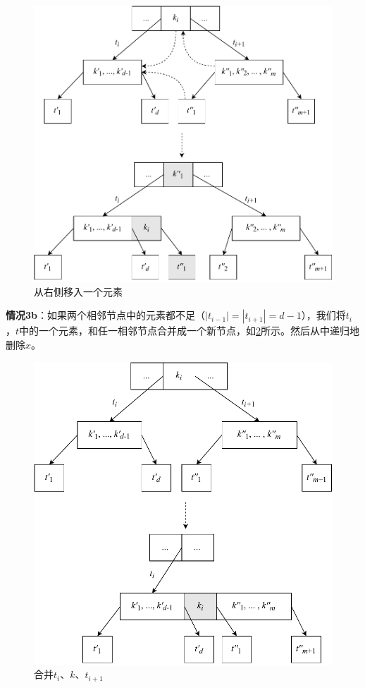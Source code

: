 \documentclass[b5paper]{ctexart}
\begin{document}
\begin{figure}[htbp]
  \centering
  \includegraphics[scale=0.65]{img/btree-del-borrow}
  \caption{从右侧移入一个元素}
  \label{fig:btree-del-borrow}
\end{figure}

\textbf{情况3b}：如果两个相邻节点中的元素都不足（$|t_{i-1}| = |t_{i+1}| = d - 1$），我们将$t_i$，$t$中的一个元素，和任一相邻节点合并成一个新节点，如\cref{fig:btree-del-merge-subtree}所示。然后从中递归地删除$x$。

\begin{figure}[htbp]
  \centering
  \includegraphics[scale=0.65]{img/btree-del-merge-subtree}
  \caption{合并$t_i$、$k$、$t_{i+1}$}
  \label{fig:btree-del-merge-subtree}
\end{figure}
\end{document}
